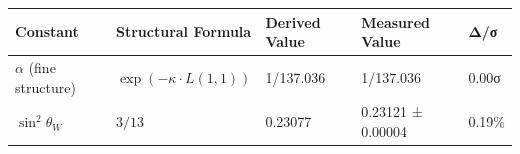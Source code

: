 \documentclass[12pt,a4paper]{article}
\begin{document}
\begin{longtable}[]{@{}lllll@{}}
\toprule
\begin{minipage}[b]{0.13\columnwidth}\raggedright
Constant\strut
\end{minipage} & \begin{minipage}[b]{0.25\columnwidth}\raggedright
Structural Formula\strut
\end{minipage} & \begin{minipage}[b]{0.20\columnwidth}\raggedright
Derived Value\strut
\end{minipage} & \begin{minipage}[b]{0.21\columnwidth}\raggedright
Measured Value\strut
\end{minipage} & \begin{minipage}[b]{0.07\columnwidth}\raggedright
Δ/σ\strut
\end{minipage}\tabularnewline
\midrule
\endhead
\begin{minipage}[t]{0.13\columnwidth}\raggedright
\(\alpha\) (fine structure)\strut
\end{minipage} & \begin{minipage}[t]{0.25\columnwidth}\raggedright
\(\exp(-\kappa \cdot L(1,1))\)\strut
\end{minipage} & \begin{minipage}[t]{0.20\columnwidth}\raggedright
1/137.036\strut
\end{minipage} & \begin{minipage}[t]{0.21\columnwidth}\raggedright
1/137.036\strut
\end{minipage} & \begin{minipage}[t]{0.07\columnwidth}\raggedright
0.00σ\strut
\end{minipage}\tabularnewline
\begin{minipage}[t]{0.13\columnwidth}\raggedright
\(\sin^2\theta_W\)\strut
\end{minipage} & \begin{minipage}[t]{0.25\columnwidth}\raggedright
\(3/13\)\strut
\end{minipage} & \begin{minipage}[t]{0.20\columnwidth}\raggedright
0.23077\strut
\end{minipage} & \begin{minipage}[t]{0.21\columnwidth}\raggedright
0.23121 ± 0.00004\strut
\end{minipage} & \begin{minipage}[t]{0.07\columnwidth}\raggedright
0.19\%\strut
\end{minipage}\tabularnewline

\end{longtable}
\end{document}
